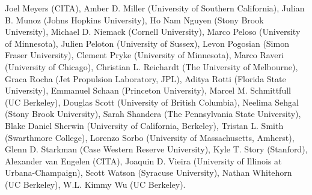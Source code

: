 Joel Meyers (CITA),
Amber D. Miller (University of Southern California),
Julian B. Munoz (Johns Hopkins University),
Ho Nam Nguyen (Stony Brook University),
Michael D. Niemack (Cornell University),
Marco Peloso (University of Minnesota),
Julien Peloton (University of Sussex),
Levon Pogosian (Simon Fraser University),
Clement Pryke (University of Minnesota),
Marco Raveri (University of Chicago),
Christian L. Reichardt (The University of Melbourne),
Graca Rocha (Jet Propulsion Laboratory, JPL),
Aditya Rotti (Florida State University),
Emmanuel Schaan (Princeton University),
Marcel M. Schmittfull (UC Berkeley),
Douglas Scott (University of British Columbia),
Neelima Sehgal (Stony Brook University),
Sarah Shandera (The Pennsylvania State University),
Blake Daniel Sherwin (University of California, Berkeley),
Tristan L. Smith (Swarthmore College),
Lorenzo Sorbo (University of Massachusetts, Amherst),
Glenn D. Starkman (Case Western Reserve University),
Kyle T. Story (Stanford),
Alexander van Engelen (CITA),
Joaquin D. Vieira (University of Illinois at Urbana-Champaign),
Scott Watson (Syracuse University),
Nathan Whitehorn (UC Berkeley),
W.L. Kimmy Wu (UC Berkeley).
